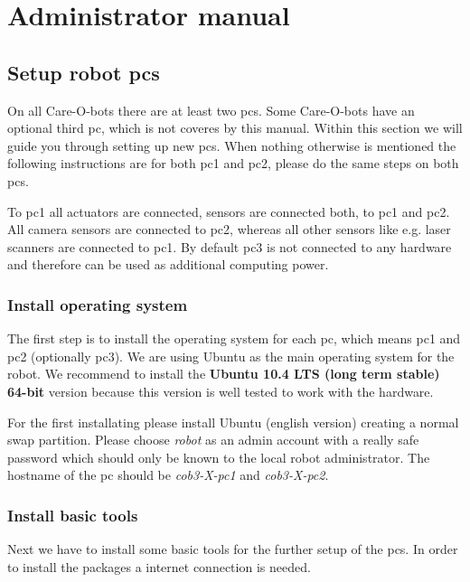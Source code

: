 
\chapter{Administrator manual}
\label{chap:admin}

\section{Setup robot pcs}
On all Care-O-bots there are at least two pcs. Some Care-O-bots have an optional third pc, which is not coveres by this manual. Within this section we will guide you through setting up new pcs. When nothing otherwise is mentioned the following instructions are for both pc1 and pc2, please do the same steps on both pcs.

To pc1 all actuators are connected, sensors are connected both, to pc1 and pc2. All camera sensors are connected to pc2, whereas all other sensors like e.g. laser scanners are connected to pc1. By default pc3 is not connected to any hardware and therefore can be used as additional computing power.

\subsection{Install operating system}
The first step is to install the operating system for each pc, which means pc1 and pc2 (optionally pc3). We are using Ubuntu as the main operating system for the robot. We recommend to install the \textbf{Ubuntu 10.4 LTS (long term stable) 64-bit} version because this version is well tested to work with the hardware. 

For the first installating please install Ubuntu (english version) creating a normal swap partition. Please choose \textit{robot} as an admin account with a really safe password which should only be known to the local robot administrator. The hostname of the pc should be \textit{cob3-X-pc1} and \textit{cob3-X-pc2}.

\subsection{Install basic tools}
Next we have to install some basic tools for the further setup of the pcs. In order to install the packages a internet connection is needed.

